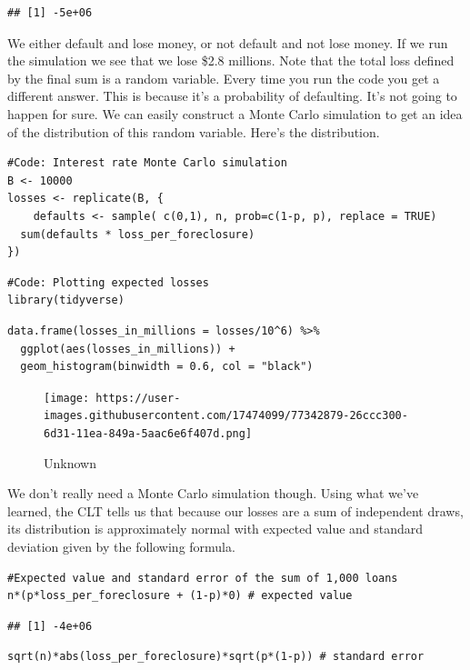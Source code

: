 \documentclass[
]{article}
\begin{document}
\begin{verbatim}
## [1] -5e+06
\end{verbatim}

We either default and lose money, or not default and not lose money. If
we run the simulation we see that we lose \$2.8 millions. Note that the
total loss defined by the final sum is a random variable. Every time you
run the code you get a different answer. This is because it's a
probability of defaulting. It's not going to happen for sure. We can
easily construct a Monte Carlo simulation to get an idea of the
distribution of this random variable. Here's the distribution.

\begin{verbatim}
#Code: Interest rate Monte Carlo simulation
B <- 10000
losses <- replicate(B, {
    defaults <- sample( c(0,1), n, prob=c(1-p, p), replace = TRUE) 
  sum(defaults * loss_per_foreclosure)
})
\end{verbatim}

\begin{verbatim}
#Code: Plotting expected losses
library(tidyverse)
\end{verbatim}

\begin{verbatim}
data.frame(losses_in_millions = losses/10^6) %>%
  ggplot(aes(losses_in_millions)) +
  geom_histogram(binwidth = 0.6, col = "black")
\end{verbatim}

\begin{figure}
\centering
\texttt{[image: https://user-images.githubusercontent.com/17474099/77342879-26ccc300-6d31-11ea-849a-5aac6e6f407d.png]}
\caption{Unknown}
\end{figure}

We don't really need a Monte Carlo simulation though. Using what we've
learned, the CLT tells us that because our losses are a sum of
independent draws, its distribution is approximately normal with
expected value and standard deviation given by the following formula.

\begin{verbatim}
#Expected value and standard error of the sum of 1,000 loans
n*(p*loss_per_foreclosure + (1-p)*0) # expected value   
\end{verbatim}

\begin{verbatim}
## [1] -4e+06
\end{verbatim}

\begin{verbatim}
sqrt(n)*abs(loss_per_foreclosure)*sqrt(p*(1-p)) # standard error 
\end{verbatim}
\end{document}
